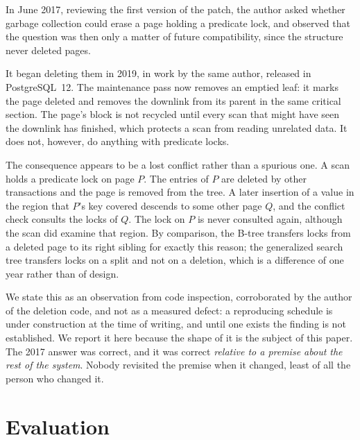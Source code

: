 In June 2017, reviewing the first version of the patch, the author asked whether
garbage collection could erase a page holding a predicate lock, and observed that
the question was then only a matter of future compatibility, since the structure
never deleted pages.

It began deleting them in 2019, in work by the same author, released in
PostgreSQL~12. The maintenance pass now removes an emptied leaf: it marks the page
deleted and removes the downlink from its parent in the same critical section.
The page's block is not recycled until every scan that might have seen the
downlink has finished, which protects a scan from reading unrelated data. It does
not, however, do anything with predicate locks.

The consequence appears to be a lost conflict rather than a spurious one. A scan
holds a predicate lock on page $P$. The entries of $P$ are deleted by other
transactions and the page is removed from the tree. A later insertion of a value
in the region that $P$'s key covered descends to some other page $Q$, and the
conflict check consults the locks of $Q$. The lock on $P$ is never consulted
again, although the scan did examine that region. By comparison, the B-tree
transfers locks from a deleted page to its right sibling for exactly this reason;
the generalized search tree transfers locks on a split and not on a deletion,
which is a difference of one year rather than of design.

We state this as an observation from code inspection, corroborated by the author
of the deletion code, and not as a measured defect: a reproducing schedule is
under construction at the time of writing, and until one exists the finding is
not established. We report it here because the shape of it is the subject of this
paper. The 2017 answer was correct, and it was correct \emph{relative to a
premise about the rest of the system}. Nobody revisited the premise when it
changed, least of all the person who changed it.

\section{Evaluation}

%

